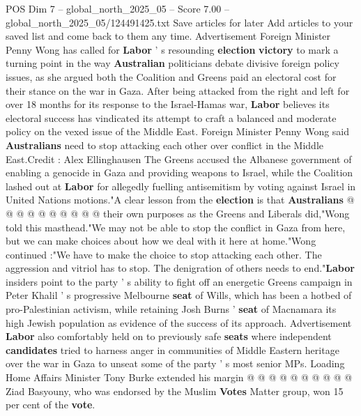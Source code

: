 \begin{textsample}{POS Dim 7 – global\_north\_2025\_05 – Score 7.00 – global\_north\_2025\_05/124491425.txt}  \label{ex:f7_pos_330}
Save articles for later Add articles to your saved list and come back to them any time.
Advertisement Foreign Minister Penny Wong has called for \textbf{Labor} ' s resounding \textbf{election} \textbf{victory} to mark a turning point in the way \textbf{Australian} politicians debate divisive foreign policy issues, as she argued both the Coalition and Greens paid an electoral cost for their stance on the war in Gaza.
After being attacked from the right and left for over 18 months for its response to the Israel-Hamas war, \textbf{Labor} believes its electoral success has vindicated its attempt to craft a balanced and moderate policy on the vexed issue of the Middle East.
Foreign Minister Penny Wong said \textbf{Australians} need to stop attacking each other over conflict in the Middle East.Credit : Alex Ellinghausen The Greens accused the Albanese government of enabling a genocide in Gaza and providing weapons to Israel, while the Coalition lashed out at \textbf{Labor} for allegedly fuelling antisemitism by voting against Israel in United Nations motions."A clear lesson from the \textbf{election} is that \textbf{Australians} @ @ @ @ @ @ @ @ @ @ their own purposes as the Greens and Liberals did,"Wong told this masthead."We may not be able to stop the conflict in Gaza from here, but we can make choices about how we deal with it here at home."Wong continued :"We have to make the choice to stop attacking each other.
The aggression and vitriol has to stop.
The denigration of others needs to end."\textbf{Labor} insiders point to the party ' s ability to fight off an energetic Greens campaign in Peter Khalil ' s progressive Melbourne \textbf{seat} of Wills, which has been a hotbed of pro-Palestinian activism, while retaining Josh Burns ' \textbf{seat} of Macnamara its high Jewish population as evidence of the success of its approach.
Advertisement \textbf{Labor} also comfortably held on to previously safe \textbf{seats} where independent \textbf{candidates} tried to harness anger in communities of Middle Eastern heritage over the war in Gaza to unseat some of the party ' s most senior MPs.
Loading Home Affairs Minister Tony Burke extended his margin @ @ @ @ @ @ @ @ @ @ Ziad Basyouny, who was endorsed by the Muslim \textbf{Votes} Matter group, won 15 per cent of the \textbf{vote}.

\end{textsample}
